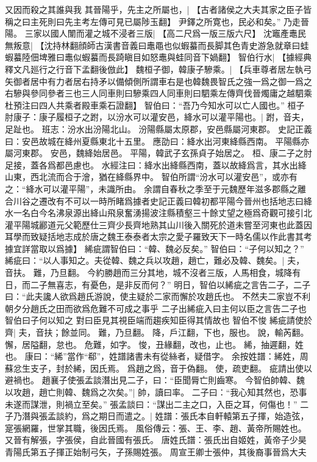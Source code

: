 又因而殺之其誰與我
其晉陽乎，先主之所屬也，|{
	【古者諸侯之大夫其家之臣子皆稱之曰主死則曰先主考左傳可見已屬陟玉翻】}
尹鐸之所寛也，民必和矣。”
乃走晉陽。
三家以國人闈而灌之城不浸者三版|{
	【高二尺爲一版三版六尺】}
沈竈產鼃民無叛意|{
	【沈持林翻顔師古漢書音義曰鼃黽也似蝦蟇而長脚其色青史游急就章曰蛙蝦蟇陸佃埤雅曰鼃似蝦蟇而長踦瞋目如怒鼃與蛙同音下媧翻】}
智伯行水|{
	【據經典釋文凡廵行之行音下孟翻後倣此】
	}
魏桓子御，韓康子驂乘。|{
	【兵車尊者居左執弓矢御者居中有力者居右持矛以備傾側所謂車右是也韓魏畏智氏之強一爲之御一爲之右驂與參同參者三也三人同車則曰驂乘四人同車則曰駟乘左傳齊伐晉燭庸之越駟乘杜預注曰四人共乘者殿車乘石證翻】
	}
智伯曰：“吾乃今知水可以亡人國也。”
桓子肘康子：康子履桓子之跗，以汾水可以灌安邑，絳水可以灌平陽也。|{
	跗，音夫，足趾也。
	班志：汾水出汾陽北山。
	汾陽縣屬太原郡，安邑縣屬河東郡。
	史記正義曰：安邑故城在絳州夏縣東北十五里。
	應劭曰：絳水出河東絳縣西南。
	平陽縣亦屬河東郡。
	安邑，魏絳始居邑。
	平陽，韓武子玄孫貞子始居之。
	桓、康二子之肘足接，蓋各爲都邑慮也。
	水經注曰：絳水出絳縣西南，蓋以故絳爲言，其水出絳山東，西北流而合于澮，猶在絳縣界中。
	智伯所謂“汾水可以灌安邑”，或亦有之：“絳水可以灌平陽”，未識所由。
	余謂自春秋之季至于元魏歷年滋多郡縣之離合川谷之遷改有不可以一時所睹爲據者史記正義曰韓初都平陽今晉州也括地志曰絳水一名白今名沸泉源出絳山飛泉奮湧揚波注縣積壑三十餘丈望之極爲奇觀可接引北灌平陽城酈道元父範歷仕三齊少長齊地熟其山川後入關死於道未嘗至河東也此蓋因耳學而致疑括地志成於唐之魏王泰泰者太宗之愛子羅致天下一時名儒以作此書其考據宜詳當取以爲據】}
絺疵謂智伯曰：“韓、魏必反矣。”
智伯曰：“子何以知之？”
絺疵曰：“以人事知之。夫從韓、魏之兵以攻趙，趙亡，難必及韓、魏矣。|{
	夫，音扶。
	難，乃旦翻。
	}
今約勝趙而三分其地，城不沒者三版，人馬相食，城降有日，而二子無喜志，有憂色，是非反而何？”
明日，智伯以絺疵之言告二子，二子曰：“此夫讒人欲爲趙氏游說，使主疑於二家而懈於攻趙氏也。
不然夫二家豈不利朝夕分趙氏之田而欲爲危難不可成之事乎
二子出絺疵入曰主何以臣之言告二子也
智伯曰子何以知之
對曰臣見其視臣端而趨疾知臣得其情故也
智伯不悛
絺疵請使於齊|{
	夫，音扶；餘並同。
	難，乃旦翻。
	降，戶江翻，下也，服也。
	說，輸芮翻。
	懈，居隘翻，怠也。
	危難，如字。
	悛，丑緣翻，改也，止也。
	絺，抽遲翻，姓也。
	康曰：“絺”當作“郗”，姓譜諸書未有從絲者，疑借字。
	余按姓譜：絺姓，周蘇忿生支子，封於絺，因氏焉。
	爲趙之爲，音于偽翻。
	使，疏吏翻。
	疵請出使以避禍也。
	}
趙襄子使張孟談潛出見二子，曰：“臣聞脣亡則齒寒。
今智伯帥韓、魏以攻趙，趙亡則韓、魏爲之次矣。”|{
	帥，讀曰率。
	}
二子曰：“我心知其然也，恐事未遂而謀泄，則禍立至矣。”
張孟談曰：“謀出二主之口，入臣之耳，何傷也！”
二子乃潛與張孟談約，爲之期日而遣之。|{
	姓譜：張氏本自軒轅第五子揮，始造弦，寔張網羅，世掌其職，後因氏焉。
	風俗傳云：張、王、李、趙、黃帝所賜姓也。
	又晉有解張，字張侯，自此晉國有張氏。
	唐姓氏譜：張氏出自姬姓，黃帝子少昊青陽氏第五子揮正始制弓矢，子孫賜姓張。
	周宣王卿士張仲，其後裔事晉爲大夫
	}
